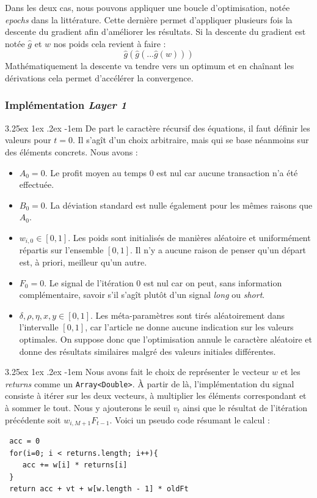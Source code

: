 \documentclass[a4paper, 11pt]{article}
\makeatletter
\renewcommand\paragraph{\@startsection{paragraph}{5}{\z@}%
  {3.25ex \@plus1ex \@minus.2ex}%
  {-1em}%
  {\normalfont\normalsize\bfseries}}
\makeatother
\begin{document}
Dans les deux cas, nous pouvons appliquer une boucle d'optimisation, notée \textit{epochs} dans la littérature. Cette dernière permet d'appliquer plusieurs
fois la descente du gradient afin d'améliorer les résultats. Si la descente du gradient est notée $\widehat{g}$ et $w$ nos poids cela revient à faire :
$$\widehat{g}(\widehat{g}(...\widehat{g}(w)))$$
Mathématiquement la descente va tendre vers un optimum et en chaînant les dérivations cela permet d'accélérer la convergence.

\subsubsection{Implémentation \textit{Layer 1}}

\paragraph{}
De part le caractère récursif des équations, il faut définir les valeurs pour $t=0$. Il s'agît d'un choix arbitraire, mais qui se base néanmoins sur des
éléments concrets. Nous avons :
\begin{itemize}
 \item $A_0 = 0$. Le profit moyen au temps $0$ est nul car aucune transaction n'a été effectuée.
 \item $B_0 = 0$. La déviation standard est nulle également pour les mêmes raisons que $A_0$.
 \item $w_{i,0} \in [0,1]$. Les poids sont initialisés de manières aléatoire et uniformément répartis sur l'ensemble $[0,1]$. Il n'y a aucune raison
 de penser qu'un départ est, à priori, meilleur qu'un autre.
 \item $F_0 = 0$. Le signal de l'itération 0 est nul car on peut, sans information complémentaire, savoir s'il s'agît plutôt d'un signal \textit{long} ou
 \textit{short}.
 \item $\delta,\rho,\eta,x,y \in [0,1]$. Les méta-paramètres sont tirés aléatoirement dans l'intervalle $[0,1]$, car l'article ne donne aucune
 indication sur les valeurs optimales. On suppose donc que l'optimisation annule le caractère aléatoire et donne des résultats similaires malgré des
 valeurs initiales différentes.
\end{itemize}

\paragraph{}
Nous avons fait le choix de représenter le vecteur $w$ et les \textit{returns} comme un \texttt{Array<Double>}. À partir de là, l'implémentation du signal
consiste à itérer sur les deux vecteurs, à multiplier les éléments correspondant et à sommer le tout. Nous y ajouterons le seuil $v_t$ ainsi que le 
résultat de l'itération précédente soit $w_{i,M+1} F_{t-1}$.
Voici un pseudo code résumant le calcul :
\begin{lstlisting}
 acc = 0
 for(i=0; i < returns.length; i++){
    acc += w[i] * returns[i]
 }
 return acc + vt + w[w.length - 1] * oldFt
\end{lstlisting}
\end{document}

